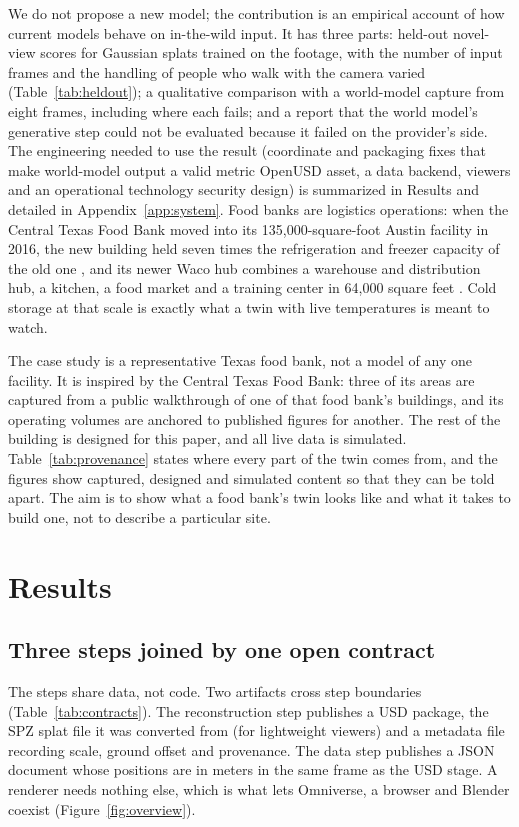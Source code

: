 \documentclass{article}
\begin{document}
We do not propose a new model; the contribution is an empirical account of
how current models behave on in-the-wild input. It has three parts: held-out
novel-view scores for Gaussian splats trained on the footage, with the number
of input frames and the handling of people who walk with the camera varied
(Table~\ref{tab:heldout}); a qualitative comparison with a world-model capture
from eight frames, including where each fails; and a report that the
world model's generative step could not be evaluated because it failed on
the provider's side. The engineering needed to use the result (coordinate and
packaging fixes that make world-model output a valid metric OpenUSD asset, a
data backend, viewers and an operational technology security design) is
summarized in Results and detailed in Appendix~\ref{app:system}. Food banks are logistics operations: when
the Central Texas Food Bank moved into its 135,000-square-foot Austin
facility in 2016, the new building held seven times the refrigeration and
freezer capacity of the old one \cite{ctfb2016facility}, and its newer Waco
hub combines a warehouse and distribution hub, a kitchen, a food market and a
training center in 64,000 square feet \cite{kxxv2026waco}. Cold storage at that
scale is exactly what a twin with live temperatures is meant to watch.

The case study is a representative Texas food bank, not a model of any one
facility. It is inspired by the Central Texas Food Bank: three of its areas
are captured from a public walkthrough of one of that food bank's buildings,
and its operating volumes are anchored to published figures for another. The
rest of the building is designed for this paper, and all live data is
simulated. Table~\ref{tab:provenance} states where every part of the twin
comes from, and the figures show captured, designed and simulated content so
that they can be told apart. The aim is to show what a food bank's twin looks
like and what it takes to build one, not to describe a particular site.

\section{Results}

\subsection{Three steps joined by one open contract}
The steps share data, not code. Two artifacts cross step boundaries
(Table~\ref{tab:contracts}). The reconstruction step publishes a USD package,
the SPZ splat file it was converted from (for lightweight viewers) and a
metadata file recording scale, ground offset and provenance. The data step
publishes a JSON document whose positions are in meters in the same frame as
the USD stage. A renderer needs nothing else, which is what lets Omniverse, a
browser and Blender coexist (Figure~\ref{fig:overview}).
\end{document}

